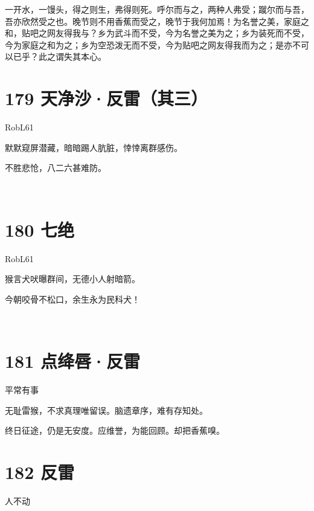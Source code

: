 \documentclass[UTF8,12pt,oneside]{ctexbook}
\begin{document}
        一开水，一馒头，得之则生，弗得则死。呼尔而与之，两种人弗受；蹴尔而与吾，吾亦欣然受之也。晚节则不用香蕉而受之，晚节于我何加焉！为名誉之美，家庭之和，贴吧之网友得我与？乡为武斗而不受，今为名誉之美为之；乡为装死而不受，今为家庭之和为之；乡为空恐泼无而不受，今为贴吧之网友得我而为之；是亦不可以已乎？此之谓失其本心。

        \section{179 天净沙·反雷（其三）}
        \begin{center}
            RobL61
        \end{center}
        
        \begin{center}
        默默窥屏潜藏，暗暗踢人肮脏，悻悻离群感伤。
        
        不胜悲怆，八二六甚难防。

        ~\\
        \end{center}

        \section{180 七绝}
        \begin{center}
            RobL61
        \end{center}

        \begin{center}
        猴言犬吠曝群间，无德小人射暗箭。
        
        今朝咬骨不松口，余生永为民科犬！

        ~\\
        \end{center}

        \section{181 点绛唇·反雷}
        \begin{center}
            平常有事
        \end{center}
        
        无耻雷猴，不求真理唯留误。脑遗章序，难有存知处。
    
        终日征途，仍是无安度。应维誉，为能回顾。却把香蕉嗅。

        \newpage

        \section{182 反雷}
        \begin{center}
            人不动
        \end{center}
\end{document}

